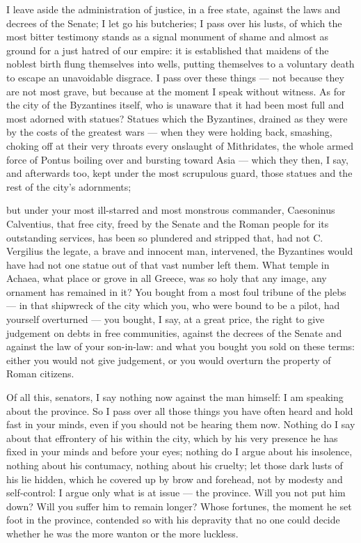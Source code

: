  I leave aside the administration of justice, in a free state, against the laws and decrees of the Senate; I let go his butcheries; I pass over his lusts, of which the most bitter testimony stands as a signal monument of shame and almost as ground for a just hatred of our empire: it is established that maidens of the noblest birth flung themselves into wells, putting themselves to a voluntary death to escape an unavoidable disgrace. I pass over these things --- not because they are not most grave, but because at the moment I speak without witness. As for the city of the Byzantines itself, who is unaware that it had been most full and most adorned with statues? Statues which the Byzantines, drained as they were by the costs of the greatest wars --- when they were holding back, smashing, choking off at their very throats every onslaught of Mithridates, the whole armed force of Pontus boiling over and bursting toward Asia --- which they then, I say, and afterwards too, kept under the most scrupulous guard, those statues and the rest of the city's adornments;

 but under your most ill-starred and most monstrous commander, Caesoninus Calventius, that free city, freed by the Senate and the Roman people for its outstanding services, has been so plundered and stripped that, had not C. Vergilius the legate, a brave and innocent man, intervened, the Byzantines would have had not one statue out of that vast number left them. What temple in Achaea, what place or grove in all Greece, was so holy that any image, any ornament has remained in it? You bought from a most foul tribune of the plebs --- in that shipwreck of the city which you, who were bound to be a pilot, had yourself overturned --- you bought, I say, at a great price, the right to give judgement on debts in free communities, against the decrees of the Senate and against the law of your son-in-law: and what you bought you sold on these terms: either you would not give judgement, or you would overturn the property of Roman citizens.

 Of all this, senators, I say nothing now against the man himself: I am speaking about the province. So I pass over all those things you have often heard and hold fast in your minds, even if you should not be hearing them now. Nothing do I say about that effrontery of his within the city, which by his very presence he has fixed in your minds and before your eyes; nothing do I argue about his insolence, nothing about his contumacy, nothing about his cruelty; let those dark lusts of his lie hidden, which he covered up by brow and forehead, not by modesty and self-control: I argue only what is at issue --- the province. Will you not put him down? Will you suffer him to remain longer? Whose fortunes, the moment he set foot in the province, contended so with his depravity that no one could decide whether he was the more wanton or the more luckless.

